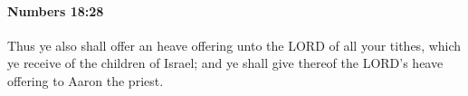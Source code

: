 
		\paragraph{Numbers 18:28} %
			\label{NUMBERS-18-28}

			Thus ye also shall offer an heave offering unto the LORD of all your tithes, which ye receive of the children of Israel; and ye shall give thereof the LORD’s heave offering to Aaron the priest.


